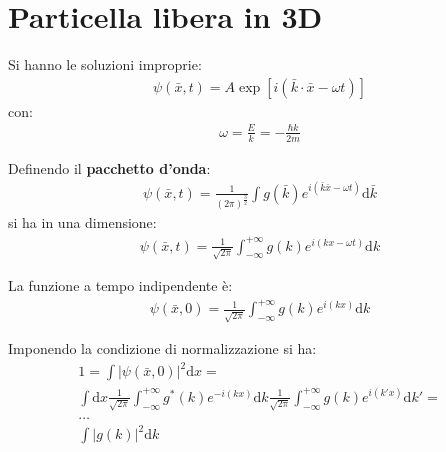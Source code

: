 \chapter{Particella libera in 3D} %
Si hanno le soluzioni improprie:
\begin{equation}\begin{split}
\psi \left(\bar x,t\right)=A\exp{\left[i\left(\bar k\cdot \bar x-\omega t\right)\right]}
\end{split}\end{equation}
con:
\begin{equation}\begin{split}
\omega =\frac{E}{k}=-\frac{\hbar k}{2m}
\end{split}\end{equation}

Definendo il \textbf{pacchetto d'onda}:
\begin{equation}\begin{split}
\psi \left(\bar x,t\right)=\frac{1}{\left(2\pi\right)^{\frac{3}{2}}}\int{g\left(\bar k\right)e^{i\left(\bar k\bar x-\omega t\right)}\textrm{d}\bar k}
\end{split}\end{equation}
si ha in una dimensione:
\begin{equation}\begin{split}
\psi \left(\bar x,t\right)=\frac{1}{\sqrt{2\pi}}\int_{-\infty }^{+\infty }{g\left(k\right)e^{i\left(kx-\omega t\right)}\textrm{d}k}
\end{split}\end{equation}

La funzione a tempo indipendente è:
\begin{equation}\begin{split}
\psi \left(\bar x,0\right)=\frac{1}{\sqrt{2\pi}}\int_{-\infty }^{+\infty }{g\left(k\right)e^{i\left(kx\right)}\textrm{d}k}
\end{split}\end{equation}

Imponendo la condizione di normalizzazione si ha:
\begin{equation}\begin{split}
1=\int{|\psi \left(\bar x,0\right)|^2\textrm{d}x}=\\
\int{\textrm{d}x}\frac{1}{\sqrt{2\pi}}\int_{-\infty }^{+\infty }{g^*\left(k\right)e^{-i\left(kx\right)}\textrm{d}k}\frac{1}{\sqrt{2\pi}}\int_{-\infty }^{+\infty }{g\left(k\right)e^{i\left(k'x\right)}\textrm{d}k'}=\\
\dots \\
\int{|g\left(k\right)|^2\textrm{d}k}
\end{split}\end{equation}

